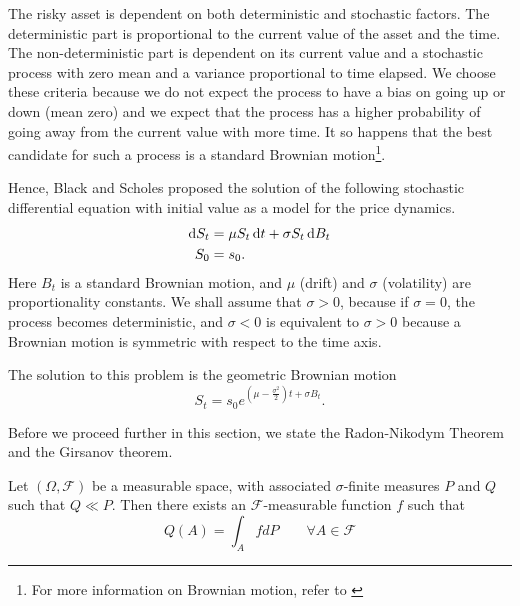 The risky asset is dependent on both deterministic and stochastic factors. The deterministic part is proportional to the current value of the asset and the time. The non-deterministic part is dependent on its current value and a stochastic process with zero mean and a variance proportional to time elapsed. We choose these criteria because we do not expect the process to have a bias on going up or down (mean zero) and we expect that the process has a higher probability of going away from the current value with more time. It so happens that the best candidate for such a process is a standard Brownian motion\footnote{For more information on Brownian motion, refer to \cite[Section 3.1]{Lamberton1996}}.

Hence, Black and Scholes proposed the solution of the following stochastic differential equation with initial value as a model for the price dynamics.
\begin{subequations}
	\label{eq:continous-risky-sde}
	\begin{align}
		\dif S_t  &=  \mu S_t \dif t + \sigma S_t \dif B_t \\
		S_0  &=  s_0 .
	\end{align}
\end{subequations}
Here $ B_t $ is a standard Brownian motion, and $ \mu $ (drift) and $ \sigma $ (volatility) are proportionality constants. We shall assume that $ \sigma > 0 $, because if $ \sigma = 0 $, the process becomes deterministic, and $ \sigma < 0 $ is equivalent to $ \sigma > 0 $ because a Brownian motion is symmetric with respect to the time axis.

The solution to this problem is the geometric Brownian motion
\begin{equation}
\label{eq:continous-risky-int}
S_t = s_0 e^{ ( \mu - \frac{\sigma^2}{2} )t + \sigma B_t }.
\end{equation}


Before we proceed further in this section, we state the Radon-Nikodym Theorem and the Girsanov theorem.

\begin{thm}
	\label{thm:radon-nikodym}
	Let $ (\Omega, \mathcal{F}) $ be a measurable space, with associated $ \sigma $-finite measures $ P $ and $ Q $ such that $ Q \ll P $. Then there exists an $ \mathcal{F} $-measurable function $ f $ such that
	\begin{equation*}
	Q(A) = \int_{A} f dP  \qquad  \forall A \in \mathcal{F}
	\end{equation*}
\end{thm}

